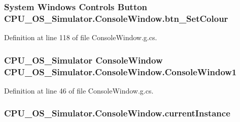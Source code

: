 \subsubsection[{btn\+\_\+\+Set\+Colour}]{\setlength{\rightskip}{0pt plus 5cm}System Windows Controls Button C\+P\+U\+\_\+\+O\+S\+\_\+\+Simulator.\+Console\+Window.\+btn\+\_\+\+Set\+Colour\hspace{0.3cm}{\ttfamily [package]}}\label{class_c_p_u___o_s___simulator_1_1_console_window_a374a86e391068f8d05edb9649ce3d7f4}


Definition at line 118 of file Console\+Window.\+g.\+cs.

\hypertarget{class_c_p_u___o_s___simulator_1_1_console_window_aac987ccfb7f82cf736d42355f96e886b}{}
\subsubsection[{Console\+Window1}]{\setlength{\rightskip}{0pt plus 5cm}C\+P\+U\+\_\+\+O\+S\+\_\+\+Simulator {\bf Console\+Window} C\+P\+U\+\_\+\+O\+S\+\_\+\+Simulator.\+Console\+Window.\+Console\+Window1\hspace{0.3cm}{\ttfamily [package]}}\label{class_c_p_u___o_s___simulator_1_1_console_window_aac987ccfb7f82cf736d42355f96e886b}


Definition at line 46 of file Console\+Window.\+g.\+cs.

\hypertarget{class_c_p_u___o_s___simulator_1_1_console_window_abee2fd1e118dd4f81dc2142bc033da4a}{}
\subsubsection[{current\+Instance}]{ C\+P\+U\+\_\+\+O\+S\+\_\+\+Simulator.\+Console\+Window.\+current\+Instance\hspace{0.3cm}{\ttfamily [static]}}\label{class_c_p_u___o_s___simulator_1_1_console_window_abee2fd1e118dd4f81dc2142bc033da4a}


